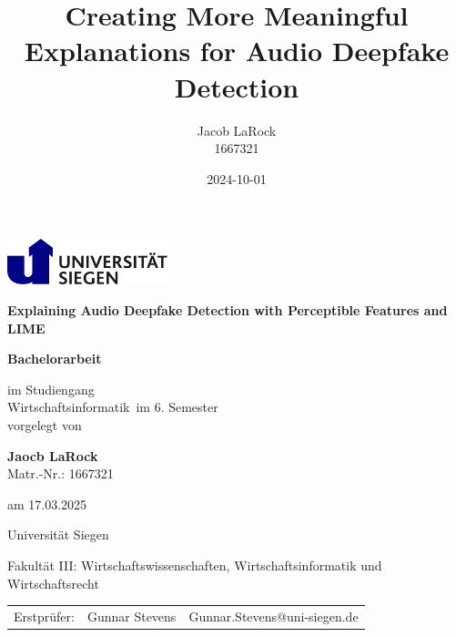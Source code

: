 \documentclass{article}
\title{Creating More Meaningful Explanations for Audio Deepfake Detection}
\date{2024-10-01}
\author{Jacob LaRock\\1667321}
\makeatletter
\def\Institute{Universität Siegen}
\def\KindOfWork{Bachelorarbeit}
\def\Studiengang{Wirtschaftsinformatik}
\def\Fakultaet{Fakultät III: Wirtschaftswissenschaften, Wirtschaftsinformatik und Wirtschaftsrecht}
\def\Title{Explaining Audio Deepfake Detection with Perceptible Features and LIME}
\def\Subtitle{}
\def\student{Jaocb LaRock}
\def\studentno{1667321}
\def\Date{17.03.2025}
\def\semester{6}
\def\erstpruefer{Gunnar Stevens}
\def\erstprueferMail{Gunnar.Stevens@uni-siegen.de}
\makeatother
\begin{document}
	\begin{titlepage}
        \begin{minipage}{0.9\linewidth}
			\centering
			\includegraphics [width=0.35\textwidth]{images/LogoSiegen}
        \end{minipage}

		\vspace{2cm}

		\centering

		{\Large\bfseries \Title\par}
		{\large\bfseries \Subtitle\par}
		\vspace{2cm}

		{\large \textbf{\KindOfWork}\par}

		\vspace{1.5cm}

		{\normalsize im Studiengang \\
			\Studiengang \ im \semester. Semester \\
		}
		\vspace{0.5cm}
		{\normalsize vorgelegt von}
		\vspace{0.5cm}

		{\normalsize \textbf{\student} \\
			Matr.-Nr.: \studentno  \\}
		{am \normalsize \Date\par}

		\vspace{0.5cm}

		{\Institute} \par
		{\Fakultaet}\par

		\vspace{1cm}

    {\begin{table}[h]
			\centering
			\begin{tabular}{lll}
				{Erstprüfer:} & \erstpruefer & \erstprueferMail \\
			\end{tabular}
		\end{table}}     
		\vfill
	\end{titlepage}
    \newpage
\end{document}
